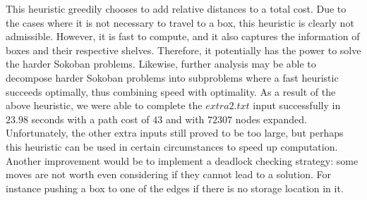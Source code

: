 \documentclass[11pt]{article}
\begin{document}
This heuristic greedily chooses to add relative distances to a total cost. Due to the cases where it is not necessary to travel to a box, this heuristic is clearly not admissible. However, it is fast to compute, and it also captures the information of boxes and their respective shelves. Therefore, it potentially has the power to solve the harder Sokoban problems. Likewise, further analysis may be able to decompose harder Sokoban problems into subproblems where a fast heuristic succeeds optimally, thus combining speed with optimality. As a result of the above heuristic, we were able to complete the $extra2.txt$ input successfully in $23.98$ seconds with a path cost of $43$ and with $72307$ nodes expanded. Unfortunately, the other extra inputs still proved to be too large, but perhaps this heuristic can be used in certain circumstances to speed up computation.\\

Another improvement would be to implement a deadlock checking strategy: some moves are not worth even considering if they cannot lead to a solution. For instance pushing a box to one of the edges if there is no storage location in it. 
\end{document}
